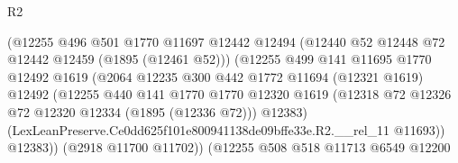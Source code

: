 \begin{lexlean}{R2}
\begin{coremodule}
                                        (@12255
                                          @496
                                          @501
                                          @1770
                                          @11697
                                          @12442
                                          @12494
                                          (@12440 @52 @12448 @72 @12442 @12459 (@1895 (@12461 @52)))
                                          (@12255
                                            @499
                                            @141
                                            @11695
                                            @1770
                                            @12492
                                            @1619
                                            (@2064
                                              @12235
                                              @300
                                              @442
                                              @1772
                                              @11694
                                              (@12321 @1619)
                                              @12492
                                              (@12255
                                                @440
                                                @141
                                                @1770
                                                @1770
                                                @12320
                                                @1619
                                                (@12318
                                                  @72
                                                  @12326
                                                  @72
                                                  @12320
                                                  @12334
                                                  (@1895 (@12336 @72)))
                                                @12383)
                                              (LexLeanPreserve.Ce0dd625f101e800941138de09bffe33e.R2.__rel_11
                                                @11693))
                                            @12383))
                                        (@2918 @11700 @11702))
                                      (@12255
                                        @508
                                        @518
                                        @11713
                                        @6549
                                        @12200

\end{coremodule}
\end{lexlean}

